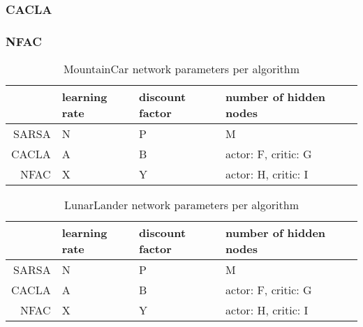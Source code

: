 \subsubsection{CACLA}
\subsubsection{NFAC}


\begin{table}
\centering
\label{tab:mntparam}
\begin{tabular}{r|llll}
                     & learning rate & discount factor & number of hidden nodes \\\hline
SARSA & N          & P               & M         \\
CACLA & A          & B               & actor: F, critic: G         \\
NFAC    & X          & Y              & actor: H, critic: I        
\end{tabular}
\caption{MountainCar network parameters per algorithm}
\end{table}

\begin{table}
\centering
\label{tab:lunarparam}
\begin{tabular}{r|llll}
                     & learning rate & discount factor & number of hidden nodes \\\hline
SARSA & N          & P               & M         \\
CACLA & A          & B               & actor: F, critic: G         \\
NFAC    & X          & Y              & actor: H, critic: I        
\end{tabular}
\caption{LunarLander network parameters per algorithm}
\end{table}

